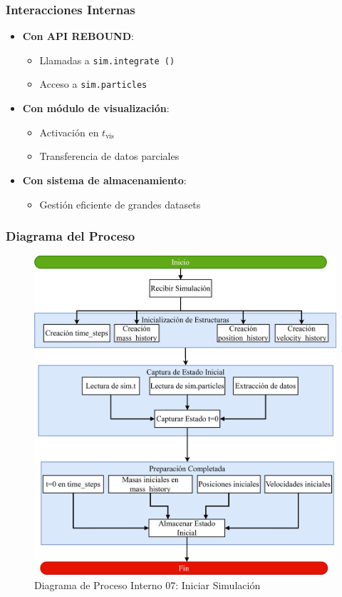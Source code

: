 \subsubsection{Interacciones Internas}
\begin{itemize}
    \item \textbf{Con API REBOUND}:
    \begin{itemize}
        \item Llamadas a \texttt{sim.integrate~()}
        \item Acceso a \texttt{sim.particles}
    \end{itemize}
    \item \textbf{Con módulo de visualización}:
    \begin{itemize}
        \item Activación en $t_{\text{vis}}$
        \item Transferencia de datos parciales
    \end{itemize}
    \item \textbf{Con sistema de almacenamiento}:
    \begin{itemize}
        \item Gestión eficiente de grandes datasets
    \end{itemize}
\end{itemize}

\subsubsection{Diagrama del Proceso}
\begin{figure}[H]
    \centering
    \includegraphics[width=\textwidth]{img/Analisis/DiagramaProcesos/DiagramaProceso07_IniciarSimulacion.png}
    \caption{Diagrama de Proceso Interno 07: Iniciar Simulación}%
    \label{fig:process_diagram07}
\end{figure}